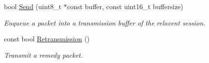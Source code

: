\begin{DoxyCompactItemize}
\item 
bool \hyperlink{class_network_coding_1_1_transmission_block_a4a372836698727d1cd31e0e353198318}{Send} (uint8\+\_\+t $\ast$const buffer, const uint16\+\_\+t buffersize)
\begin{DoxyCompactList}\small\item\em Enqueue a packet into a transmission buffer of the relavent session. \end{DoxyCompactList}\item 
const bool \hyperlink{class_network_coding_1_1_transmission_block_ad8d4de3ed6b6dda67a09afb1c7760ac3}{Retransmission} ()
\begin{DoxyCompactList}\small\item\em Transmit a remedy packet. \end{DoxyCompactList}\end{DoxyCompactItemize}
